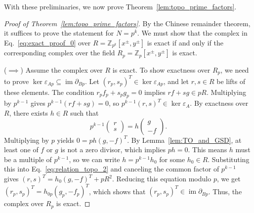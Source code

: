 \documentclass[aps,prb,english,superscriptaddress,twocolumn,tightenlines,showpacs,longbibliography,floatfix,amsfonts]{revtex4-2}
\begin{document}
With these preliminaries, we now prove Theorem~\ref{lem:topo_prime_factors}.

\begin{proof}[Proof of Theorem~\ref{lem:topo_prime_factors}]
By the Chinese remainder theorem, it suffices to prove the statement for $N=p^k$. We must show that the complex in Eq.~\eqref{eq:exact_proof_0} over $R = \mathbb{Z}_{p^k}[x^\pm, y^\pm]$ is exact if and only if the corresponding complex over the field $R_p = \mathbb{Z}_p[x^\pm, y^\pm]$ is exact.

($\implies$) Assume the complex over $R$ is exact. To show exactness over $R_p$, we need to prove $\ker\varepsilon_{Ap} \subseteq \operatorname{im}\partial_{Bp}$. Let $(r_p, s_p)^T \in \ker\varepsilon_{Ap}$, and let $r, s \in R$ be lifts of these elements. The condition $r_p f_p + s_p g_p = 0$ implies $rf+sg \in pR$. Multiplying by $p^{k-1}$ gives $p^{k-1}(rf+sg) = 0$, so $p^{k-1}(r,s)^T \in \ker\varepsilon_A$. By exactness over $R$, there exists $h \in R$ such that
\begin{equation}
    p^{k-1}\begin{pmatrix} r \\ s \end{pmatrix} = h \begin{pmatrix} g \\ -f \end{pmatrix}. \label{eq:relation_topo_2}
\end{equation}
Multiplying by $p$ yields $0 = ph(g, -f)^T$. By Lemma~\ref{lem:TO_and_GSD}, at least one of $f$ or $g$ is not a zero divisor, which implies $ph=0$. This means $h$ must be a multiple of $p^{k-1}$, so we can write $h=p^{k-1}h_0$ for some $h_0 \in R$. Substituting this into Eq.~\eqref{eq:relation_topo_2} and canceling the common factor of $p^{k-1}$ gives $(r,s)^T = h_0(g,-f)^T+pR^2$. Reducing this equation modulo $p$, we get $(r_p, s_p)^T = h_{0p}(g_p, -f_p)^T$, which shows that $(r_p, s_p)^T \in \operatorname{im}\partial_{Bp}$. Thus, the complex over $R_p$ is exact.


\end{proof}
\end{document}
